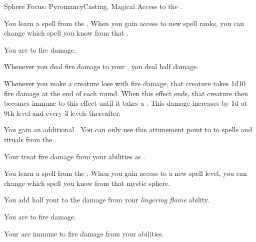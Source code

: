     \begin{feat}{Sphere Focus: Pyromancy}{Casting, Magical}
        \featpre Access to the  .

         You learn a spell from the  .
        When you gain access to new spell ranks, you can change which spell you know from that .

         You are  to fire damage.

         Whenever you deal fire damage to your , you deal half damage.

         Whenever you make a creature lose  with fire damage, that creature  takes 1d10 fire damage at the end of each round.
        When this effect ends, that creature then becomes immune to this effect until it takes a .
        This damage increases by \plus1d at 9th level and every 3 levels thereafter.

         You gain an additional .
        You can only use this attunement point to  to spells and rituals from the  .

         Your  treat fire damage from your abilities as .

         You learn a spell from the  .
        When you gain access to a new spell level, you can change which spell you know from that mystic sphere.

         You add half your  to the damage from your \textit{lingering flame} ability.

         You are  to fire damage.

         Your  are immune to fire damage from your abilities.
    \end{feat}

